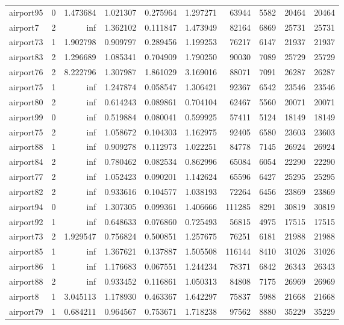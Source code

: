\begin{longtable}{|l|r|r|r|r|r|r|r|r|r|}
airport95 & 0 & 1.473684 & 1.021307 & 0.275964 & 1.297271 & 63944 & 5582 & 20464 & 20464 \\
airport7 & 2 & inf & 1.362102 & 0.111847 & 1.473949 & 82164 & 6869 & 25731 & 25731 \\
airport73 & 1 & 1.902798 & 0.909797 & 0.289456 & 1.199253 & 76217 & 6147 & 21937 & 21937 \\
airport83 & 2 & 1.296689 & 1.085341 & 0.704909 & 1.790250 & 90030 & 7089 & 25729 & 25729 \\
airport76 & 2 & 8.222796 & 1.307987 & 1.861029 & 3.169016 & 88071 & 7091 & 26287 & 26287 \\
airport75 & 1 & inf & 1.247874 & 0.058547 & 1.306421 & 92367 & 6542 & 23546 & 23546 \\
airport80 & 2 & inf & 0.614243 & 0.089861 & 0.704104 & 62467 & 5560 & 20071 & 20071 \\
airport99 & 0 & inf & 0.519884 & 0.080041 & 0.599925 & 57411 & 5124 & 18149 & 18149 \\
airport75 & 2 & inf & 1.058672 & 0.104303 & 1.162975 & 92405 & 6580 & 23603 & 23603 \\
airport88 & 1 & inf & 0.909278 & 0.112973 & 1.022251 & 84778 & 7145 & 26924 & 26924 \\
airport84 & 2 & inf & 0.780462 & 0.082534 & 0.862996 & 65084 & 6054 & 22290 & 22290 \\
airport77 & 2 & inf & 1.052423 & 0.090201 & 1.142624 & 65596 & 6427 & 25295 & 25295 \\
airport82 & 2 & inf & 0.933616 & 0.104577 & 1.038193 & 72264 & 6456 & 23869 & 23869 \\
airport94 & 0 & inf & 1.307305 & 0.099361 & 1.406666 & 111285 & 8291 & 30819 & 30819 \\
airport92 & 1 & inf & 0.648633 & 0.076860 & 0.725493 & 56815 & 4975 & 17515 & 17515 \\
airport73 & 2 & 1.929547 & 0.756824 & 0.500851 & 1.257675 & 76251 & 6181 & 21988 & 21988 \\
airport85 & 1 & inf & 1.367621 & 0.137887 & 1.505508 & 116144 & 8410 & 31026 & 31026 \\
airport86 & 1 & inf & 1.176683 & 0.067551 & 1.244234 & 78371 & 6842 & 26343 & 26343 \\
airport88 & 2 & inf & 0.933452 & 0.116861 & 1.050313 & 84808 & 7175 & 26969 & 26969 \\
airport8 & 1 & 3.045113 & 1.178930 & 0.463367 & 1.642297 & 75837 & 5988 & 21668 & 21668 \\
airport79 & 1 & 0.684211 & 0.964567 & 0.753671 & 1.718238 & 97562 & 8880 & 35229 & 35229 \\

\end{longtable}
